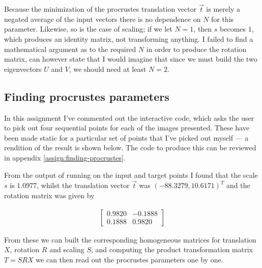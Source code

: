 Because the minimization of the procrustes translation vector $\vec{t}$ is
merely a negated average of the input vectors there is no dependence on $N$
for this parameter. Likewise, so is the case of scaling; if we let $N=1$, then
$s$ becomes $1$, which produces an identity matrix, not transforming anything.
I failed to find a mathematical argument as to the required $N$ in order to
produce the rotation matrix, can however state that I would imagine that since
we must build the two eigenvectors $U$ and $V$, we should need at least $N=2$.

\subsection{Finding procrustes parameters}
In this assignment I've commented out the interactive code, which asks the
user to pick out four sequential points for each of the images presented.
These have been made static for a particular set of points that I've picked
out myself --- a rendition of the result is shown below. The code to produce
this can be reviewed in appendix \ref{assign:finding-procrustes}.


From the output of running  on the input and target points I
found that the scale $s$ is $1.0977$, whilst the translation vector $\vec{t}$
was $(-88.3279, 10.6171)^T$ and the rotation matrix was given by

\begin{align*}
    \begin{bmatrix}
        0.9820 & -0.1888 \\
        0.1888 &  0.9820
    \end{bmatrix}
\end{align*}

From these we can built the corresponding homogeneous matrices for
translation $X$, rotation $R$ and scaling $S$, and computing the product
transformation matrix $T = SRX$ we can then read out the procrustes parameters
one by one.

